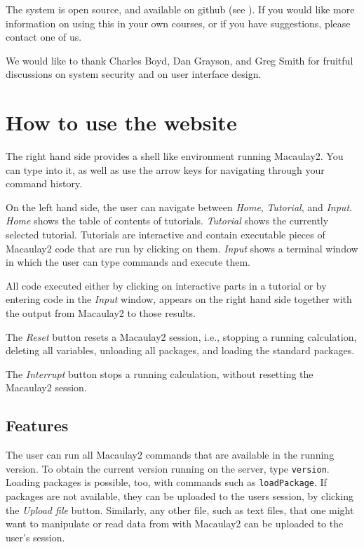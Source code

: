 \documentclass[]{article}
\begin{document}
The system is open source, and available on github (see \cite{github}).
If you would like more information on using this in your own courses,
or if you have suggestions, please contact one of us.

We would like to thank Charles Boyd, Dan Grayson, and Greg Smith for
fruitful discussions on system security and on user interface design.

\section{How to use the website}
The right hand side provides a shell like environment running
Macaulay2. You can type into it, as well as use the arrow keys for
navigating through your command history.

On the left hand side, the user can navigate between {\it Home}, {\it
  Tutorial}, and {\it Input}. {\it Home} shows the table of contents
of tutorials. {\it Tutorial} shows the currently selected
tutorial. Tutorials are interactive and contain executable pieces of
Macaulay2 code that are run by clicking on them. {\it Input} shows a
terminal window in which the user can type commands and execute them.

All code executed either by clicking on interactive parts in a
tutorial or by entering code in the {\it Input} window, appears on the
right hand side together with the output from Macaulay2 to those
results.

The {\it Reset} button resets a Macaulay2 session, i.e., stopping a
running calculation, deleting all variables, unloading all packages,
and loading the standard packages.

The {\it Interrupt} button stops a running calculation, without
resetting the Macaulay2 session.

\subsection{Features}

The user can run all Macaulay2 commands that are available in the
running version. To obtain the current version running on the server,
type {\tt version}. Loading packages is possible, too, with commands
such as {\tt loadPackage}. If packages are not available, they can be
uploaded to the users session, by clicking the {\it Upload file}
button. Similarly, any other file, such as text files, that one might
want to manipulate or read data from with Macaulay2 can be uploaded to
the user's session.
\end{document}
